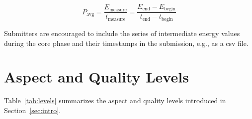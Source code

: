 \begin{equation}
	P_{\text{avg}} = \frac{E_\text{measure}}{t_\text{measure}} = \frac{E_\text{end} - E_\text{begin}}{t_\text{end} - t_\text{begin}}
\end{equation}

Submitters are encouraged to include the series of intermediate energy values during the core phase and their timestamps in the submission, e.g., as a csv file.

\section{Aspect and Quality Levels}
\label{sec:AQLevels}

Table~\ref{tab:levels} summarizes the aspect and quality levels introduced in Section~\ref{sec:intro}. 


